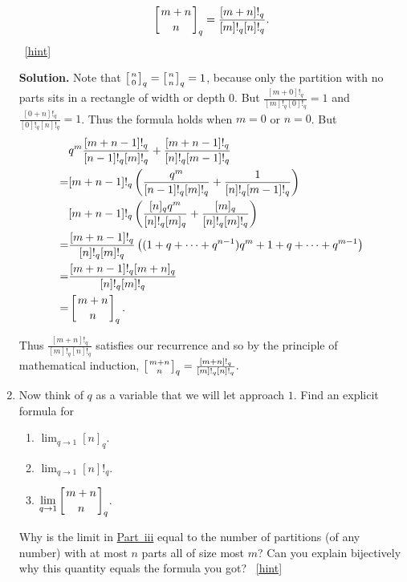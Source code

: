 \documentclass{book}
\begin{document}
\begin{activity}[]
\begin{enumerate}[font=\bfseries,label=(\alph*),ref=\alph*]
\begin{equation*}
\left[{m+n\atop n}\right]_q = \frac{[m+n]!_q}{[m]!_q[n]!_q}.
\end{equation*}
%
~\hfill{\tiny\hyperlink{a-327.f}{[hint]}\hypertarget{q-327.f}{}}\par\smallskip%
\noindent\textbf{Solution.}\hypertarget{solution-270}{}\quad%
\hypertarget{p-1708}{}%
Note that \(\left[{n\atop0}\right]_q= \left[{n\atop n}\right]_q = 1\), because only the partition with no parts sits in a rectangle of width or depth 0. But \(\frac{[m+0]!_q}{[m]!_q[0]!_q} =1\) and \(\frac{[0+n]!_q}{[0]!_q[n]!_q} =1\). Thus the formula holds when \(m=0\) or \(n=0\). But%
\begin{align*}
& q^m\frac{[m+n-1]!_q}{[n-1]!_q[m]!_q}+\frac{[m+n-1]!_q}{[n]!_q[m-1]!_q}\\
=& \relax[m+n-1]!_q\left(\frac{q^m}{[n-1]!_q[m]!_q}
+\frac{1}{[n]!_q[m-1]!_q}\right)\\
& \relax[m+n-1]!_q\left(\frac{[n]_qq^m}{[n]!_q[m]_q}+\frac{[m]_q}{[n]!_q[m]!_q}\right)\\
=& \relax\frac{[m+n-1]!_q}{[n]!_q[m]!_q}\left((1+q+\cdots+q^{n-1})q^m +
1+q+\cdots+q^{m-1}\right)\\
=& \relax\frac{[m+n-1]!_q[m+n]_q}{[n]!_q[m]!_q}\\
=& \left[{m+n\atop n}\right]_q.
\end{align*}
%
\par
\hypertarget{p-1709}{}%
Thus \(\frac{[m+n]!_q}{[m]!_q[n]!_q}\) satisfies our recurrence and so by the principle of mathematical induction, \(\left[{m+n\atop n}\right]_q = \frac{[m+n]!_q}{[m]!_q[n]!_q}.\)%
\item\label{task-291} \hypertarget{p-1710}{}%
Now think of \(q\) as a variable that we will let approach \(1\). Find an explicit formula for \leavevmode%
\begin{enumerate}[label=(\roman*)]
\item\hypertarget{li-62}{}\(\displaystyle\lim_{q\rightarrow 1} [n]_q\).%
\item\hypertarget{li-63}{}\(\displaystyle\lim_{q\rightarrow 1} [n]!_q\).%
\item\hypertarget{q-binomial-lim}{}\(\displaystyle\lim_{q\rightarrow 1} \left[{m+n\atop n}\right]_q\).%
\end{enumerate}
 Why is the limit in \hyperlink{q-binomial-lim}{Part~iii} equal to the number of partitions (of any number) with at most \(n\) parts all of size most \(m\)? Can you explain bijectively why this quantity equals the formula you got?%
~\hfill{\tiny\hyperlink{a-327.g}{[hint]}\hypertarget{q-327.g}{}}\par\smallskip%

\end{enumerate}
\end{activity}
\end{document}
